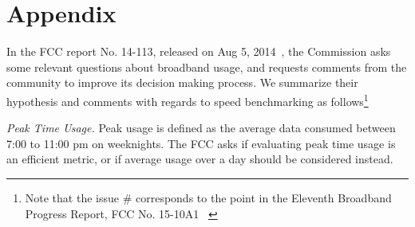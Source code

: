 \section{Appendix}
\label{sec:issues}

In the FCC report No. 14-113, released on Aug 5, 2014~\cite{fcc2014progress-report}, the Commission asks some relevant questions about broadband usage, and requests comments from the community to improve its decision making process. We summarize their hypothesis and comments with regards to speed benchmarking as follows\footnote{Note that the issue \# corresponds to the point in the Eleventh Broadband Progress Report,
FCC No. 15-10A1 ~\cite{fcc2015progress-report}\label{foot:fcc-issue-numbers}}

 \emph{Peak Time Usage.} Peak usage is defined as the average data consumed between 7:00 to 11:00 pm on weeknights. The FCC asks if evaluating peak time usage is an efficient metric, or if average usage over a day should be considered instead.

